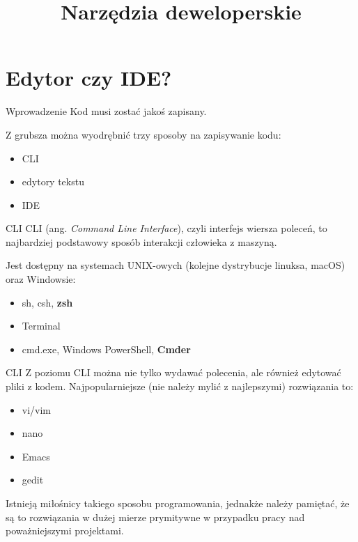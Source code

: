 

\title{Narzędzia deweloperskie}



\section{Edytor czy IDE?}

\begin{frame}{Wprowadzenie}
	Kod musi zostać jakoś zapisany.

	Z grubsza można wyodrębnić trzy sposoby na zapisywanie kodu:
	\begin{itemize}
		\item CLI
		\item edytory tekstu
		\item IDE
	\end{itemize}
\end{frame}

\begin{frame}{CLI}
	CLI (ang. \emph{Command Line Interface}), czyli interfejs wiersza poleceń, to najbardziej podstawowy sposób interakcji człowieka z maszyną.
	
	Jest dostępny na systemach UNIX-owych (kolejne dystrybucje linuksa, macOS) oraz Windowsie:
	\begin{itemize}
		\item sh, csh, \textbf{zsh}
		\item Terminal
		\item cmd.exe, Windows PowerShell, \textbf{Cmder}
	\end{itemize}
\end{frame}

\begin{frame}{CLI}
	Z poziomu CLI można nie tylko wydawać polecenia, ale również edytować pliki z kodem. Najpopularniejsze (nie należy mylić z najlepszymi) rozwiązania to:
	\begin{itemize}
		\item vi/vim
		\item nano
		\item Emacs
		\item gedit
	\end{itemize}
	
	Istnieją miłośnicy takiego sposobu programowania, jednakże należy pamiętać, że są to rozwiązania w dużej mierze prymitywne w przypadku pracy nad poważniejszymi projektami.
\end{frame}

